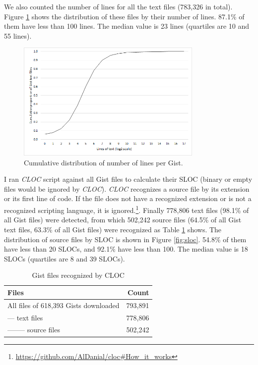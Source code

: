 We also counted the number of lines for all the text files (783,326 in total). Figure \ref{fig:textlines} shows the distribution of these files by their number of lines. 87.1\% of them have less than 100 lines. The median value is 23 lines (quartiles are 10 and 55 lines).

\begin{figure}[!htb]
	\centering
	\includegraphics[width=0.8\textwidth]{figures/text_files_lines.png}
	\caption{Cumulative distribution of number of lines per Gist.}
	\label{fig:textlines}
\end{figure}

I ran \textit{CLOC} script against all Gist files to calculate their SLOC (binary or empty files would be ignored by \textit{CLOC}). \textit{CLOC} recognizes a source file by its extension or its first line of code. If the file does not have a recognized extension or is not a recognized scripting language, it is ignored.\footnote{\url{https://github.com/AlDanial/cloc\#How_it_works}}. Finally 778,806 text files (98.1\% of all Gist files) were detected, from which 502,242 source files (64.5\% of all Gist text files, 63.3\% of all Gist files) were recognized as Table \ref{tb:clocfiles} shows. The distribution of source files by SLOC is shown in Figure \ref{fig:sloc}. 54.8\% of them have less than 20 SLOCs, and 92.1\% have less than 100. The median value is 18 SLOCs (quartiles are 8 and 39 SLOCs).

\begin{table}[!htb]
 \begin{center}
 \begin{tabular}{@{}lr} 
    \textbf{Files}	&	\textbf{Count} \\ \hline
	All files of 618,393 Gists downloaded &	793,891\\
	--- text files	&	778,806\\
	-------- source files &	502,242\\ \hline
 \end{tabular}
 \end{center}
 \caption{Gist files recognized by CLOC}
 \label{tb:clocfiles}
\end{table}

